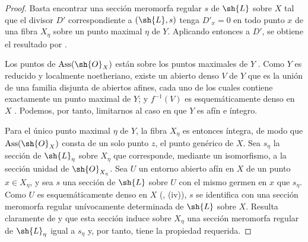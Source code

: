\begin{proof}
Basta encontrar una sección meromorfa regular $s$ de $\sh{L}$ sobre
$X$ tal que el divisor $D'$ correspondiente a $(\sh{L},s)$ tenga
$D'_x=0$ en todo punto $x$ de una fibra $X_\eta$ sobre un punto maximal
$\eta$ de $Y$. Aplicando entonces {} a $D'$, se obtiene el resultado por
{}.

Los puntos de $\operatorname{Ass}(\sh{O}_X)$ están sobre los puntos
maximales de $Y$ {}. Como $Y$ es reducido y localmente noetheriano,
existe un abierto denso $V$ de $Y$ que es la unión de una
familia disjunta de abiertos afines, cada uno de los cuales contiene exactamente un
punto maximal de $Y$; y $f^{-1}(V)$ es esquemáticamente denso en $X$
{}. Podemos, por tanto, limitarnos al caso en que $Y$ es
afín e íntegro.

Para el único punto maximal $\eta$ de $Y$, la fibra $X_\eta$ es entonces
íntegra, de modo que $\operatorname{Ass}(\sh{O}_X)$ consta de un solo punto
$z$, el punto genérico de $X$. Sea $s_\eta$ la sección de
$\sh{L}_\eta$ sobre $X_\eta$ que corresponde, mediante un isomorfismo,
a la sección unidad de $\sh{O}_{X_\eta}$. Sea $U$ un entorno abierto
afín en $X$ de un punto $x\in X_\eta$, y sea $s$ una sección
de $\sh{L}$ sobre $U$ con el mismo germen en $x$ que $s_\eta$. Como $U$
es esquemáticamente denso en $X$ ({}, (iv)), $s$ se identifica con una
sección meromorfa regular unívocamente determinada de $\sh{L}$ sobre $X$.
Resulta claramente de {} y {} que esta sección induce sobre
$X_\eta$ una sección meromorfa regular de $\sh{L}_\eta$ igual a
$s_\eta$ y, por tanto, tiene la propiedad requerida.
\end{proof}
